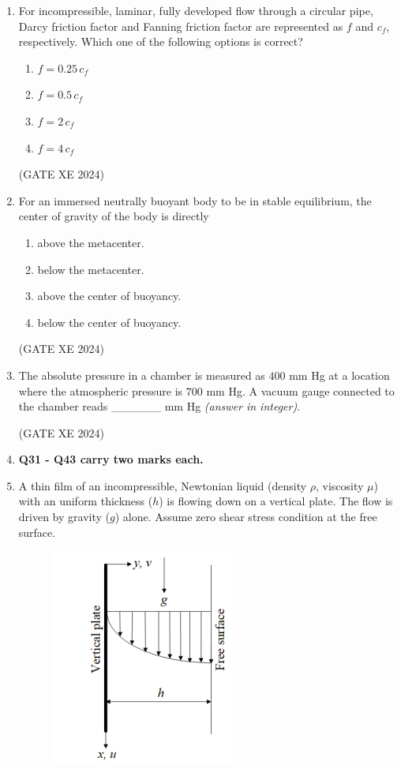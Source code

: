 \documentclass[12pt]{article}
\begin{document}
\begin{enumerate}
(GATE XE 2024)

\item For incompressible, laminar, fully developed flow through a circular pipe, Darcy friction factor and Fanning friction factor are represented as $f$ and $c_f$, respectively. Which one of the following options is correct?
\begin{enumerate}
\item $f = 0.25\,c_f$
\item $f = 0.5\,c_f$
\item $f = 2\,c_f$
\item $f = 4\,c_f$
\end{enumerate}

(GATE XE 2024)

\item For an immersed neutrally buoyant body to be in stable equilibrium, the center of gravity of the body is directly
\begin{enumerate}
\item above the metacenter.
\item below the metacenter.
\item above the center of buoyancy.
\item below the center of buoyancy.
\end{enumerate}

(GATE XE 2024)

\item The absolute pressure in a chamber is measured as $400$ mm Hg at a location where the atmospheric pressure is $700$ mm Hg. A vacuum gauge connected to the chamber reads \_\_\_\_\_\_ mm Hg \textit{(answer in integer)}.

(GATE XE 2024)

\item[] \textbf{Q31 - Q43 carry two marks each.}
\item A thin film of an incompressible, Newtonian liquid (density $\rho$, viscosity $\mu$) with an
uniform thickness ($h$) is flowing down on a vertical plate. The flow is driven by gravity ($g$) alone.
Assume zero shear stress condition at the free surface.

\begin{figure}[H]
    \centering
    \includegraphics[width=0.5\columnwidth]{figs/ass5_b_q31.png}
    \caption{}
    \label{fig:placeholder}
\end{figure}


\end{enumerate}
\end{document}
